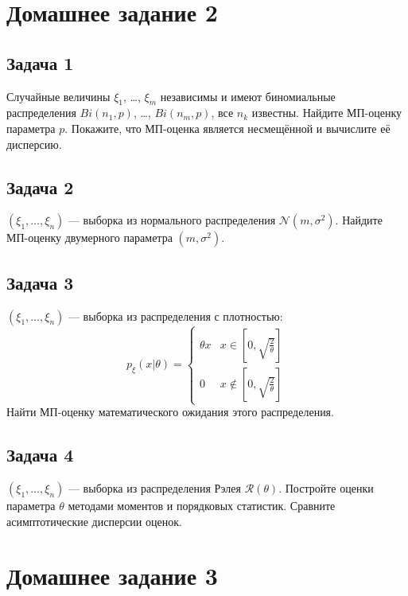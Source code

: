 \documentclass[a4paper,12pt]{article}
\begin{document}
\section*{Домашнее задание 2}

\subsection*{Задача 1 \cite[124]{Efimov}}

Случайные величины $\xi_1$, \dots, $\xi_m$ независимы и имеют биномиальные распределения $Bi(n_1, p)$, \dots, $Bi(n_m, p)$, все $n_k$ известны.
Найдите МП-оценку параметра $p$. Покажите, что МП-оценка является несмещённой и вычислите её дисперсию.

\subsection*{Задача 2}

$\left( \xi_1, \dots, \xi_n \right)$ --- выборка из нормального распределения $\mathcal{N} \left( m, \sigma^2 \right)$. Найдите МП-оценку двумерного
параметра $\left( m, \sigma^2 \right)$.

\subsection*{Задача 3 \cite[126]{Efimov}}

$\left( \xi_1, \dots, \xi_n \right)$ --- выборка из распределения с плотностью:
\[
    p_\xi(x|\theta)
    =
    \left\{
    \begin{array}{ll}
        \theta x & x \in \left[ 0, \sqrt{\frac{2}{\theta}}\right]    \\
        0        & x \notin \left[ 0, \sqrt{\frac{2}{\theta}}\right]
    \end{array}
    \right.
\]
Найти МП-оценку математического ожидания этого распределения.

\subsection*{Задача 4}

$\left( \xi_1, \dots, \xi_n \right)$ --- выборка из распределения Рэлея $\mathcal{R}(\theta)$. Постройте оценки параметра $\theta$ методами моментов
и порядковых статистик. Сравните асимптотические дисперсии оценок.

\section*{Домашнее задание 3}
\end{document}
